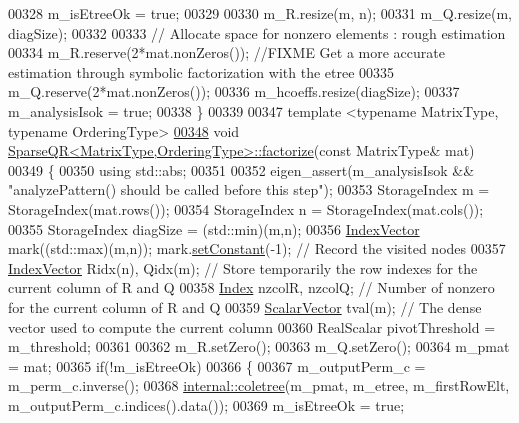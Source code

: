 \begin{DoxyCode}
00328   m\_isEtreeOk = \textcolor{keyword}{true};
00329   
00330   m\_R.resize(m, n);
00331   m\_Q.resize(m, diagSize);
00332   
00333   \textcolor{comment}{// Allocate space for nonzero elements : rough estimation}
00334   m\_R.reserve(2*mat.nonZeros()); \textcolor{comment}{//FIXME Get a more accurate estimation through symbolic factorization with
       the etree}
00335   m\_Q.reserve(2*mat.nonZeros());
00336   m\_hcoeffs.resize(diagSize);
00337   m\_analysisIsok = \textcolor{keyword}{true};
00338 \}
00339 
00347 \textcolor{keyword}{template} <\textcolor{keyword}{typename} MatrixType, \textcolor{keyword}{typename} OrderingType>
\hyperlink{group___sparse_q_r___module_a55a34bacf05bd30a1dacbccad9f03c6d}{00348} \textcolor{keywordtype}{void} \hyperlink{group___sparse_q_r___module_a55a34bacf05bd30a1dacbccad9f03c6d}{SparseQR<MatrixType,OrderingType>::factorize}(\textcolor{keyword}{const} 
      MatrixType& mat)
00349 \{
00350   \textcolor{keyword}{using} std::abs;
00351   
00352   eigen\_assert(m\_analysisIsok && \textcolor{stringliteral}{"analyzePattern() should be called before this step"});
00353   StorageIndex m = StorageIndex(mat.rows());
00354   StorageIndex n = StorageIndex(mat.cols());
00355   StorageIndex diagSize = (std::min)(m,n);
00356   \hyperlink{group___core___module}{IndexVector} mark((std::max)(m,n)); mark.\hyperlink{class_eigen_1_1_plain_object_base_ac8dea1df3d92b752cc683ff42abf6f9b}{setConstant}(-1);  \textcolor{comment}{// Record the visited
       nodes}
00357   \hyperlink{group___core___module}{IndexVector} Ridx(n), Qidx(m);                             \textcolor{comment}{// Store temporarily the row indexes
       for the current column of R and Q}
00358   \hyperlink{namespace_eigen_a62e77e0933482dafde8fe197d9a2cfde}{Index} nzcolR, nzcolQ;                                     \textcolor{comment}{// Number of nonzero for the current
       column of R and Q}
00359   \hyperlink{group___core___module}{ScalarVector} tval(m);                                     \textcolor{comment}{// The dense vector used to compute
       the current column}
00360   RealScalar pivotThreshold = m\_threshold;
00361   
00362   m\_R.setZero();
00363   m\_Q.setZero();
00364   m\_pmat = mat;
00365   \textcolor{keywordflow}{if}(!m\_isEtreeOk)
00366   \{
00367     m\_outputPerm\_c = m\_perm\_c.inverse();
00368     \hyperlink{namespace_eigen_1_1internal_a86181db74ba596a7afbfd89efcc5788c}{internal::coletree}(m\_pmat, m\_etree, m\_firstRowElt, m\_outputPerm\_c.indices().data());
00369     m\_isEtreeOk = \textcolor{keyword}{true};

\end{DoxyCode}
